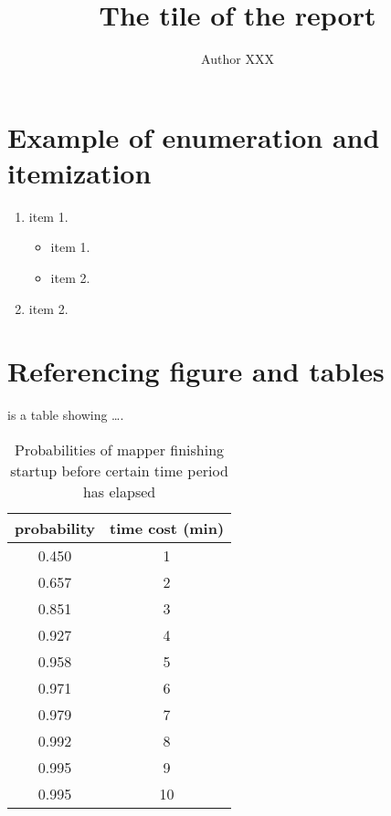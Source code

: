 \documentclass[12pt]{article}
\title{The tile of the report}
\author{Author XXX}
\begin{document}
\maketitle
\date
\noindent

\section*{Example of enumeration and itemization}
\label{section 1}
\begin{enumerate}
  \item item 1.
    \begin{itemize}
      \item item 1.
      \item item 2.
    \end{itemize}
  \item item 2.
\end{enumerate}



\section*{Referencing figure and tables}
 is a table showing \dots. \\

\begin{table}[h]
  \centering
  \begin{tabular}{cc}
    \toprule
    probability &  time cost (min) \\
    \midrule
    0.450 &          1 \\
    0.657 &          2 \\
    0.851 &          3 \\
    0.927 &          4 \\
    0.958 &          5 \\
    0.971 &          6 \\
    0.979 &          7 \\
    0.992 &          8 \\
    0.995 &          9 \\
    0.995 &         10 \\
    \bottomrule
  \end{tabular}
  \caption[Probabilities of mapper finishing startup before certain time
  period has elapsed]{Probabilities of mapper finishing startup before certain time
  period has elapsed}
  \label{tab:time_probability}
\end{table}
\end{document}
